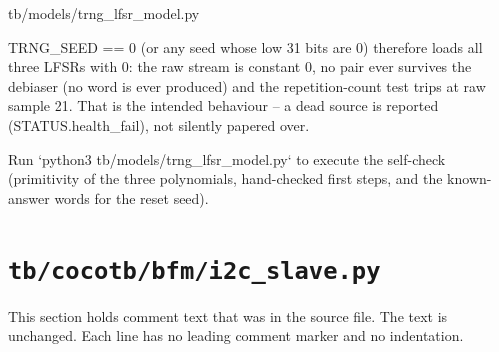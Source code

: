 \begin{relocated}{tb/models/trng_lfsr_model.py}
\begin{textblock}
TRNG_SEED == 0 (or any seed whose low 31 bits are 0) therefore loads all three LFSRs with 0: the
raw stream is constant 0, no pair ever survives the debiaser (no word is ever produced) and the
repetition-count test trips at raw sample 21. That is the intended behaviour -- a dead source is
reported (STATUS.health_fail), not silently papered over.

Run `python3 tb/models/trng_lfsr_model.py` to execute the self-check (primitivity of the three
polynomials, hand-checked first steps, and the known-answer words for the reset seed).
\end{textblock}

\end{relocated}

\section{\texttt{tb/cocotb/bfm/i2c\_slave.py}}\label{tm:suite:bfm-i2c-slave}

This section holds comment text that was in the source file. The text is unchanged. Each line has no leading comment marker and no indentation.

